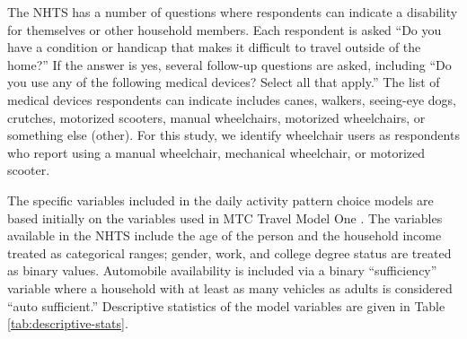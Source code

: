 \documentclass[3p, authoryear, review]{elsarticle} %
\begin{document}
The NHTS has a number of questions where respondents can indicate a disability
for themselves or other household members. Each respondent is asked ``Do you
have a condition or handicap that makes it difficult to travel outside of the
home?'' If the answer is yes, several follow-up questions are asked, including
``Do you use any of the following medical devices? Select all that apply.'' The
list of medical devices respondents can indicate includes canes, walkers,
seeing-eye dogs, crutches, motorized scooters, manual wheelchairs,
motorized wheelchairs, or something else (other).
For this study, we identify wheelchair users as respondents who report using a
manual wheelchair, mechanical wheelchair, or motorized scooter.

The specific variables included in the daily activity pattern choice models
are based initially on the variables used in MTC Travel Model One \citep{erhardt2012mtc}.
The variables available in the NHTS include the age of
the person and the household income treated as categorical ranges; gender, work,
and college degree status are treated as binary values. Automobile availability is
included via a binary ``sufficiency'' variable where a household with at least as
many vehicles as adults is considered ``auto sufficient.'' Descriptive statistics
of the model variables are given in Table \ref{tab:descriptive-stats}.
\end{document}
